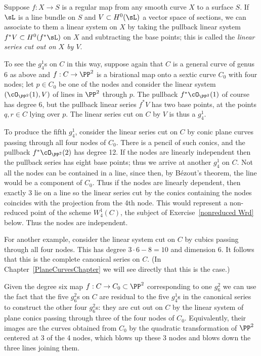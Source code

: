 Suppose $f : X \to S$ is a regular map from any smooth curve $X$ to a surface $S$. If $\sL $ is a line bundle on $S$ and $V \subset H^0(\sL )$ a vector space of sections, we can associate to them a linear system on $X$ by taking the pullback linear system $f^*V \subset H^0(f^*\sL )$ on $X$ and subtracting the base points; this is called the \emph{linear series cut out on $X$ by $V$}. 

To see the $g^{1}_{4}$s on $C$ in this way,  suppose again that $C$ is a general curve of genus 6 as above and $f : C \to \PP^2$ is a birational map onto a sextic curve $C_0$ with four nodes; let $p \in C_0$ be one of the nodes and consider the linear system $(\cO_{\PP^2}(1),V)$ of lines in $\PP^2$ through $p$. The pullback $f^*\cO_{\PP^2}(1)$ of course has degree 6, but the pullback linear series $f^*V$ has two base points, at the points $q, r \in C$ lying over $p$. The linear series cut on $C$ by $V$ is thus a $g^1_4$. 

To produce the fifth $g^1_4$, consider the linear series cut on $C$ by conic plane curves passing through all four nodes of $C_0$. There is a pencil of such conics, and the pullback $f^*\cO_{\PP^2}(2)$ has degree 12.
If the nodes are linearly independent then the pullback series has eight base points; thus we arrive at another $g^1_4$ on $C$.  Not all the nodes can be contained in a line, since then, by B\'ezout's theorem, the line would be a component of $C_0$. Thus if the nodes are linearly dependent, then exactly 3 lie on a line
so the linear series cut by the conics containing the nodes coincides with the projection from the 4th node. 
This would represent a non-reduced point of the scheme $W^1_4(C)$, the subject of Exercise~\ref{nonreduced Wrd} below. Thus the nodes are independent.

For another example, consider the linear system cut on $C$ by cubics passing through all four nodes. This has degree $3\cdot 6 - 8 = 10$ and dimension 6. It follows that this is the complete canonical series on $C$. (In Chapter~\ref{PlaneCurvesChapter} we will see directly that this is the case.)

Given the degree six map $f : C \to C_0 \subset \PP^2$ corresponding to one $g^2_6$ we can use the fact that the five $g^2_6$s on $C$ are residual to the five $g^1_4$s in the canonical series to construct the other four $g^2_6$s: they are cut out on $C$ by the linear system of plane conics passing through three of the four nodes of $C_0$. Equivalently, their images are the curves obtained from $C_{0}$ by the quadratic transformation
of $\PP^{2}$ centered at 3 of the 4 nodes, which blows up these 3 nodes and blows down the three lines
 joining them.
 
